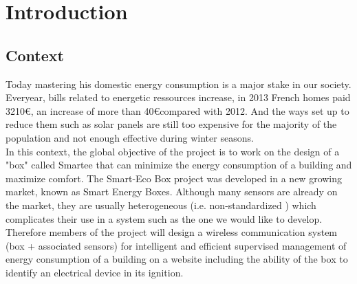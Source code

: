 %
%
\section{Introduction}

\subsection{Context}

Today mastering his domestic energy consumption is a major stake in our society. Everyear, bills related to energetic ressources increase, in 2013 French homes paid 3210\euro, an increase of more than 40\euro compared with 2012. And the ways set up to reduce them such as solar panels are still too expensive for the majority of the population and not enough effective during winter seasons.\\


In this context, the global objective of the project is to work on the design of a "box" called Smartee that can minimize the energy consumption of a building and maximize comfort. The Smart-Eco Box project was developed in a new growing market, known as Smart Energy Boxes. Although many sensors are already on the market, they are usually heterogeneous (i.e. non-standardized ) which complicates their use in a system such as the one we would like to develop. Therefore members of the project will design a wireless communication system (box + associated sensors) for intelligent and efficient supervised management of energy consumption of a building on a website including the ability of the box to identify an electrical device in its ignition.\\

